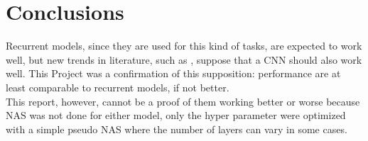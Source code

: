 

\section{Conclusions}
Recurrent models, since they are used for this kind of tasks, are expected to work well, but new trends in literature, such as \cite{cnn_time}\cite{cnn_time_2}, suppose that a CNN should also work well. This Project was a confirmation of this supposition: performance are at least comparable to recurrent models, if not better. \\
This report, however, cannot be a proof of them working better or worse because NAS was not done for either model, only the hyper parameter were optimized with a simple pseudo NAS where the number of layers can vary in some cases.

